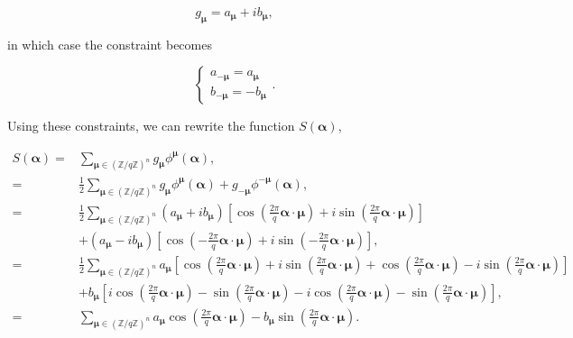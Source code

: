 \begin{equation}
    g_{\boldsymbol{\mu}} = a_{\boldsymbol{\mu}} + i b_{\boldsymbol{\mu}},
\end{equation}

\noindent
in which case the constraint becomes

\begin{equation}
    \begin{cases}
        a_{-\boldsymbol{\mu}} = a_{\boldsymbol{\mu}}\\
        b_{-\boldsymbol{\mu}} = -b_{\boldsymbol{\mu}}
    \end{cases}
    .
\end{equation}

\noindent
Using these constraints, we can rewrite the function $S(\boldsymbol{\alpha})$,

\begin{align*}
    S(\boldsymbol{\alpha}) =& \sum_{\boldsymbol{\mu} \in {(\mathbb{Z}/q\mathbb{Z})}^n} g_{\boldsymbol{\mu}} \phi^{\boldsymbol{\mu}}(\boldsymbol{\alpha}),\\
    =& \frac{1}{2} \sum_{\boldsymbol{\mu} \in {(\mathbb{Z}/q\mathbb{Z})}^n} g_{\boldsymbol{\mu}} \phi^{\boldsymbol{\mu}}(\boldsymbol{\alpha}) + g_{-\boldsymbol{\mu}} \phi^{-\boldsymbol{\mu}}(\boldsymbol{\alpha}),\\
    =& \frac{1}{2} \sum_{\boldsymbol{\mu} \in {(\mathbb{Z}/q\mathbb{Z})}^n} (a_{\boldsymbol{\mu}} + i b_{\boldsymbol{\mu}}) \left[ \cos \left( \frac{2\pi}{q} \boldsymbol{\alpha} \cdot \boldsymbol{\mu}\right) + i \sin \left( \frac{2\pi}{q} \boldsymbol{\alpha} \cdot \boldsymbol{\mu} \right)\right] \\
    &+ (a_{\boldsymbol{\mu}} - i b_{\boldsymbol{\mu}}) \left[ \cos \left( -\frac{2\pi}{q} \boldsymbol{\alpha} \cdot \boldsymbol{\mu} \right) + i \sin \left( -\frac{2\pi}{q} \boldsymbol{\alpha} \cdot \boldsymbol{\mu}\right)\right],\\
    =&  \frac{1}{2} \sum_{\boldsymbol{\mu} \in {(\mathbb{Z}/q\mathbb{Z})}^n} a_{\boldsymbol{\mu}} \left[ \cos \left( \frac{2\pi}{q} \boldsymbol{\alpha} \cdot \boldsymbol{\mu}\right) + i \sin \left( \frac{2\pi}{q} \boldsymbol{\alpha} \cdot \boldsymbol{\mu} \right) + \cos \left( \frac{2\pi}{q} \boldsymbol{\alpha} \cdot \boldsymbol{\mu}\right) - i \sin \left( \frac{2\pi}{q} \boldsymbol{\alpha} \cdot \boldsymbol{\mu} \right) \right]\\
    &+ b_{\boldsymbol{\mu}} \left[ i \cos \left( \frac{2\pi}{q} \boldsymbol{\alpha} \cdot \boldsymbol{\mu}\right) - \sin \left( \frac{2\pi}{q} \boldsymbol{\alpha} \cdot \boldsymbol{\mu} \right) - i \cos \left( \frac{2\pi}{q} \boldsymbol{\alpha} \cdot \boldsymbol{\mu}\right) - \sin \left( \frac{2\pi}{q} \boldsymbol{\alpha} \cdot \boldsymbol{\mu} \right) \right], \\
    =& \sum_{\boldsymbol{\mu} \in {(\mathbb{Z}/q\mathbb{Z})}^n} a_{\boldsymbol{\mu}} \cos \left( \frac{2\pi}{q} \boldsymbol{\alpha} \cdot \boldsymbol{\mu}\right) - b_{\boldsymbol{\mu}} \sin \left( \frac{2\pi}{q} \boldsymbol{\alpha} \cdot \boldsymbol{\mu} \right).
\end{align*}

